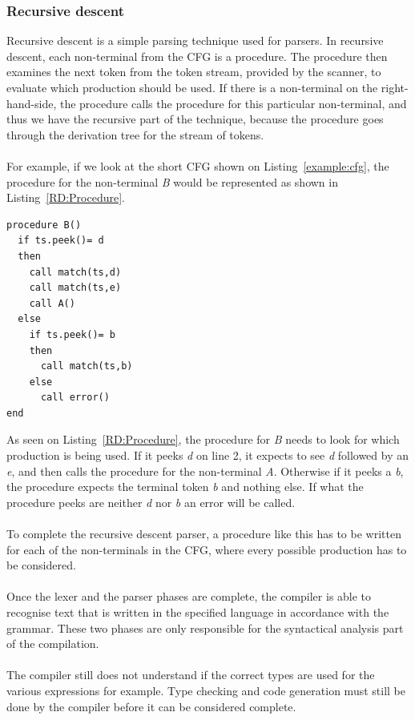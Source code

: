\subsubsection{Recursive descent}
Recursive descent is a simple parsing technique used for parsers. 
In recursive descent, each non-terminal from the CFG is a procedure. 
The procedure then examines the next token from the token stream, provided by the scanner, to evaluate which production should be used. 
If there is a non-terminal on the right-hand-side, the procedure calls the procedure for this particular non-terminal, and thus we have the recursive part of the technique, because the procedure goes through the derivation tree for the stream of tokens.
\\\\
For example, if we look at the short CFG shown on Listing~\ref{example:cfg}, the procedure for the non-terminal \textit{B} would be represented as shown in Listing~\ref{RD:Procedure}. 
\begin{lstlisting}[caption={Procedure for a recursive descent of the CFG productions}, label={RD:Procedure}]
procedure B()
  if ts.peek()= d
  then
    call match(ts,d)
    call match(ts,e)
    call A()
  else
    if ts.peek()= b
    then
      call match(ts,b) 
    else
      call error()
end
\end{lstlisting}
As seen on Listing~\ref{RD:Procedure}, the procedure for \textit{B} needs to look for which production is being used. 
If it peeks \textit{d} on line 2, it expects to see \textit{d} followed by an \textit{e}, and then calls the procedure for the non-terminal \textit{A}. 
Otherwise if it peeks a \textit{b}, the procedure expects the terminal token \textit{b} and nothing else. 
If what the procedure peeks are neither \textit{d} nor \textit{b} an error will be called.
\\\\
To complete the recursive descent parser, a procedure like this has to be written for each of the non-terminals in the CFG, where every possible production has to be considered.
\\\\
Once the lexer and the parser phases are complete, the compiler is able to recognise text that is written in the specified language in accordance with the grammar. 
These two phases are only responsible for the syntactical analysis part of the compilation. 
\\\\
The compiler still does not understand if the correct types are used for the various expressions for example. 
Type checking and code generation must still be done by the compiler before it can be considered complete.

